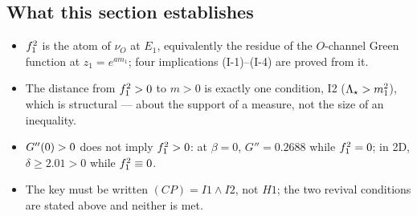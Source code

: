 
\subsection{What this section establishes}

\begin{itemize}
\item \LT{} $f_1^2$ is the atom of $\nu_O$ at $E_1$, equivalently the residue of the $O$-channel
      Green function at $z_1=e^{am_1}$; four implications (I-1)--(I-4) are proved from it.
\item \LT{} The distance from $f_1^2>0$ to $m>0$ is exactly one condition, I2
      ($\Lambda_{\star}>m_1^{2}$), which is structural --- about the support of a measure, not the size of
      an inequality.
\item \LT{} $G''(0)>0$ does not imply $f_1^2>0$: at $\beta=0$, $G''=0.2688$ while $f_1^2=0$; in 2D,
      $\delta\ge2.01>0$ while $f_1^2\equiv0$.
\item \LM{} The key must be written $(CP)=I1\wedge I2$, not $H1$; the two revival conditions are
      stated above and neither is met.
\end{itemize}
